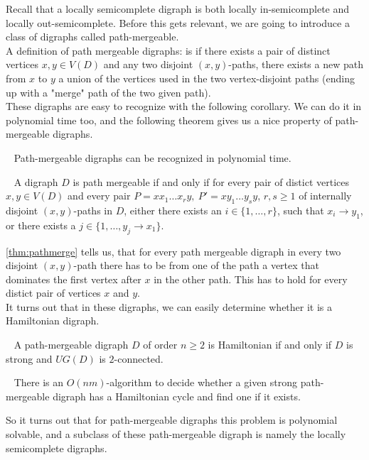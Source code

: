 Recall that a locally semicomplete digraph is both locally in-semicomplete and locally out-semicomplete. 
Before this gets relevant, we are going to introduce a class of digraphs called path-mergeable.\\ 
A definition of path mergeable digraphs: is if there exists a pair of distinct vertices $x,y\in V(D)$ and any two disjoint $(x,y)$-paths, there exists a new path from $x$ to $y$  a union of the vertices used in the two vertex-disjoint paths (ending up with a "merge" path of the two given path).\\
These digraphs are easy to recognize with the following corollary. 
We can do it in polynomial time too, and the following theorem gives us a nice property of path-mergeable digraphs.
\begin{cor}~\cite{banggutin}
    Path-mergeable digraphs can be recognized in polynomial time.
\end{cor}
\begin{thm}~\cite{banggutin}
    A digraph $D$ is path mergeable if and only if for every pair of distict vertices $x,y\in V(D)$ and every pair $P=xx_1\dots x_ry,\ P'=xy_1\dots y_sy$, $r,s\geq 1$ of internally disjoint $(x,y)$-paths in $D$, either there exists an $i\in \lbrace 1,\dots ,r\rbrace$, such that $x_i\rightarrow y_1$, or there exists a $j\in \lbrace 1,\dots, y_j\rightarrow x_1\rbrace$.
    \label{thm:pathmerge}
\end{thm}
\autoref{thm:pathmerge} tells us, that for every path mergeable digraph in every two disjoint $(x,y)$-path there has to be from one of the path a vertex that dominates the first vertex after $x$ in the other path. 
This has to hold for every distict pair of vertices $x$ and $y$. \\
It turns out that in these digraphs, we can easily determine whether it is a Hamiltonian digraph.
\begin{thm}~\cite{bangJGT20}
    A path-mergeable digraph $D$ of order $n\geq 2$ is Hamiltonian if and only if $D$ is strong and $UG(D)$ is $2$-connected.
    \label{thm:pathham}
\end{thm}
\begin{cor}~\cite{bangJGT20}
    There is an $O(nm)$-algorithm to decide whether a given strong path-mergeable digraph has a Hamiltonian cycle and find one if it exists.
    \label{cor:polypath}
\end{cor}
So it turns out that for path-mergeable digraphs this problem is polynomial solvable, and a subclass of these path-mergeable digraph is namely the locally semicomplete digraphs. 
